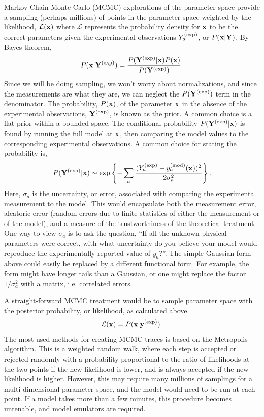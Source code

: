 Markov Chain Monte Carlo (MCMC) explorations of the parameter space provide a sampling (perhaps millions) of points in the parameter space weighted by the likelihood, ${\mathcal L}({\bf x})$ where ${\mathcal L}$ represents the probability density for ${\bf x}$ to be the correct parameters given the experimental observations $Y^{\rm(exp)}_a$, or $P({\bf x}|{\bf Y})$. By Bayes theorem,
\begin{equation}
P({\bf x}|{\bf Y}^{\rm(exp)}) = \frac{P({\bf Y}^{\rm(exp)}|{\bf x}) P({\bf x})}{P({\bf Y}^{\rm(exp)})}.
\end{equation}
Since we will be doing sampling, we won't worry about normalizations, and since the measurements are what they are, we can neglect the $P({\bf Y}^{\rm(exp)})$ term in the denominator. The probability, $P({\bf x})$, of the parameter ${\bf x}$ in the absence of the experimental observations, ${\bf Y}^{\rm(exp)}$, is known as the prior. A common choice is a flat prior within a bounded space. The conditional probability $P({\bf Y}^{\rm(exp)}|{\bf x})$ is found by running the full model at ${\bf x}$, then comparing the model values to the corresponding experimental observations. A common choice for stating the probability is,
\begin{equation}
P({\bf Y}^{\rm(exp)}|{\bf x})\sim \exp\left\{-
\sum_a\frac{(Y^{\rm(exp)}_a-y_a^{\rm(mod)}({\bf x}))^2}{2\sigma_a^2}\right\}.
\end{equation}
Here, $\sigma_a$ is the uncertainty, or error, associated with comparing the experimental measurement to the model. This would encapsulate both the measurement error, aleatoric error (random errors due to finite statistics of either the measurement or of the model), and a measure of the trustworthiness of the theoretical treatment. One way to view $\sigma_a$ is to ask the question, ``If all the unknown physical parameters were correct, with what uncertainty do you believe your model would reproduce the experimentally reported value of $y_a$?''. The simple Gaussian form above could easily be replaced by a different functional form. For example, the form might have longer tails than a Gaussian, or one might replace the factor $1/\sigma_a^2$ with a matrix, i.e. correlated errors.

A straight-forward MCMC treatment would be to sample parameter space with the posterior probability, or likelihood, as calculated above.
\[
{\mathcal L}({\bf x})=P({\bf x}|{\bf y^{\rm(exp)}}).
\]
The most-used methods for creating MCMC traces is based on the Metropolis algorithm. This is a weighted random walk, where each step is accepted or rejected randomly with a probability proportional to the ratio of likelihoods at the two points if the new likelihood is lower, and is always accepted if the new likelihood is higher. However, this may require many millions of samplings for a multi-dimensional parameter space, and the model would need to be run at each point. If a model takes more than a few minutes, this procedure becomes untenable, and model emulators are required.

